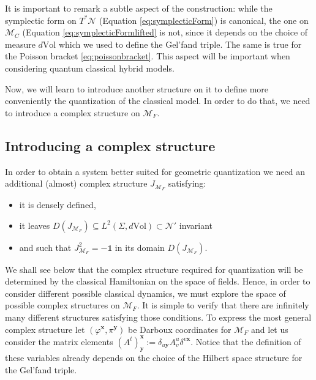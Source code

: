 \documentclass[12pt]{article}%
\begin{document}
It is important to remark a subtle aspect of the construction: while the symplectic form on $T^*\mathcal{N}$ (Equation \eqref{eq:symplecticForm}) is canonical, the one on $\mathcal{M}_C$ (Equation \eqref{eq:symplecticFormlifted}   is not, since it depends on the choice of measure $d\mathrm{Vol}$ which we used to define the Gel'fand triple. The same is true for the Poisson bracket \eqref{eq:poissonbracket}. This aspect will be important when considering quantum classical hybrid models.


Now, we will learn to introduce another structure on it to define more conveniently the quantization of the classical model. In order to do that, we need to introduce a complex structure on $\mathcal{M}_F$.

\subsection{Introducing a complex structure}
In order to obtain a system better  suited for geometric quantization we need an additional (almost) complex structure $J_{\mathcal{M}_F}$ satisfying:
\begin{itemize}
	\item it is densely defined,
	\item  it leaves $D(J_{\mathcal{M}_F})\subseteq L^2(\Sigma,d\textrm{Vol})\subset \mathcal{N}'$ invariant
	\item and such that $J_{\mathcal{M}_F}^2=-\mathds{1}$ in its domain $D(J_{\mathcal{M}_F})$.
\end{itemize}

We shall see below that the complex structure required for quantization will be determined by the classical Hamiltonian on the space of fields. Hence, in order to consider different possible classical dynamics, we must explore the space of possible complex structures on $\mathcal{M}_F$.  It is simple to verify that there are infinitely many different structures satisfying those conditions. To express the most general complex structure let $(\varphi^{\mathbf{x}},\pi^{\mathbf{y}})$ be Darboux coordinates for $\mathcal{M}_F$ and let us consider the matrix elements $(A^t)^{\mathbf{x}}_\mathbf{y}:= \delta_{u \mathbf{y}} A^u_v\delta^{v\mathbf{x}}$. Notice that the definition of these variables already depends on the choice of the Hilbert space structure for the Gel'fand triple.
\end{document}
